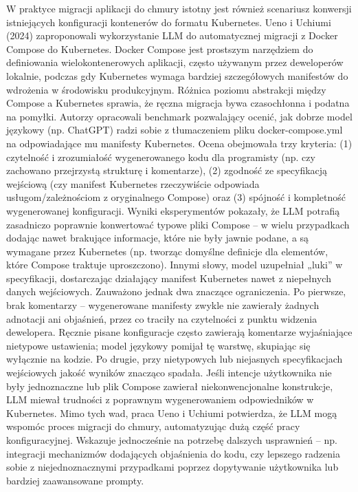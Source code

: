 W praktyce migracji aplikacji do chmury istotny jest również scenariusz konwersji istniejących konfiguracji kontenerów do formatu Kubernetes. Ueno i Uchiumi (2024) zaproponowali wykorzystanie LLM do automatycznej migracji z Docker Compose do Kubernetes. Docker Compose jest prostszym narzędziem do definiowania wielokontenerowych aplikacji, często używanym przez deweloperów lokalnie, podczas gdy Kubernetes wymaga bardziej szczegółowych manifestów do wdrożenia w środowisku produkcyjnym. Różnica poziomu abstrakcji między Compose a Kubernetes sprawia, że ręczna migracja bywa czasochłonna i podatna na pomyłki. Autorzy opracowali benchmark pozwalający ocenić, jak dobrze model językowy (np. ChatGPT) radzi sobie z tłumaczeniem pliku docker-compose.yml na odpowiadające mu manifesty Kubernetes. Ocena obejmowała trzy kryteria: (1) czytelność i zrozumiałość wygenerowanego kodu dla programisty (np. czy zachowano przejrzystą strukturę i komentarze), (2) zgodność ze specyfikacją wejściową (czy manifest Kubernetes rzeczywiście odpowiada usługom/zależnościom z oryginalnego Compose) oraz (3) spójność i kompletność wygenerowanej konfiguracji. Wyniki eksperymentów pokazały, że LLM potrafią zasadniczo poprawnie konwertować typowe pliki Compose – w wielu przypadkach dodając nawet brakujące informacje, które nie były jawnie podane, a są wymagane przez Kubernetes (np. tworząc domyślne definicje dla elementów, które Compose traktuje uproszczono). Innymi słowy, model uzupełniał „luki” w specyfikacji, dostarczając działający manifest Kubernetes nawet z niepełnych danych wejściowych. Zauważono jednak dwa znaczące ograniczenia. Po pierwsze, brak komentarzy – wygenerowane manifesty zwykle nie zawierały żadnych adnotacji ani objaśnień, przez co traciły na czytelności z punktu widzenia dewelopera. Ręcznie pisane konfiguracje często zawierają komentarze wyjaśniające nietypowe ustawienia; model językowy pomijał tę warstwę, skupiając się wyłącznie na kodzie. Po drugie, przy nietypowych lub niejasnych specyfikacjach wejściowych jakość wyników znacząco spadała. Jeśli intencje użytkownika nie były jednoznaczne lub plik Compose zawierał niekonwencjonalne konstrukcje, LLM miewał trudności z poprawnym wygenerowaniem odpowiedników w Kubernetes. Mimo tych wad, praca Ueno i Uchiumi potwierdza, że LLM mogą wspomóc proces migracji do chmury, automatyzując dużą część pracy konfiguracyjnej. Wskazuje jednocześnie na potrzebę dalszych usprawnień – np. integracji mechanizmów dodających objaśnienia do kodu, czy lepszego radzenia sobie z niejednoznacznymi przypadkami poprzez dopytywanie użytkownika lub bardziej zaawansowane prompty.

